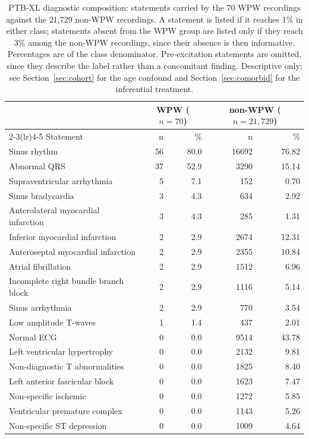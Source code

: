 \documentclass[11pt]{article}
\begin{document}
\begin{table}[htbp]
\centering
\footnotesize
\caption{PTB-XL diagnostic composition: statements carried by the 70 WPW recordings against the 21{,}729 non-WPW recordings. A statement is listed if it reaches 1\% in either class; statements absent from the WPW group are listed only if they reach 3\% among the non-WPW recordings, since their absence is then informative. Percentages are of the class denominator. Pre-excitation statements are omitted, since they describe the label rather than a concomitant finding. Descriptive only; see Section~\ref{sec:cohort} for the age confound and Section~\ref{sec:comorbid} for the inferential treatment.}
\label{tab:comorbid-ptbxl}
\begin{tabular}{lrrrr}
\toprule
 & \multicolumn{2}{c}{WPW ($n=70$)} & \multicolumn{2}{c}{non-WPW ($n=21{,}729$)} \\
\cmidrule(lr){2-3}\cmidrule(lr){4-5}
Statement & n & \% & n & \% \\
\midrule
Sinus rhythm & 56 & 80.0 & 16692 & 76.82 \\
Abnormal QRS & 37 & 52.9 & 3290 & 15.14 \\
Supraventricular arrhythmia & 5 & 7.1 & 152 & 0.70 \\
Sinus bradycardia & 3 & 4.3 & 634 & 2.92 \\
Anterolateral myocardial infarction & 3 & 4.3 & 285 & 1.31 \\
Inferior myocardial infarction & 2 & 2.9 & 2674 & 12.31 \\
Anteroseptal myocardial infarction & 2 & 2.9 & 2355 & 10.84 \\
Atrial fibrillation & 2 & 2.9 & 1512 & 6.96 \\
Incomplete right bundle branch block & 2 & 2.9 & 1116 & 5.14 \\
Sinus arrhythmia & 2 & 2.9 & 770 & 3.54 \\
Low amplitude T-waves & 1 & 1.4 & 437 & 2.01 \\
Normal ECG & 0 & 0.0 & 9514 & 43.78 \\
Left ventricular hypertrophy & 0 & 0.0 & 2132 & 9.81 \\
Non-diagnostic T abnormalities & 0 & 0.0 & 1825 & 8.40 \\
Left anterior fascicular block & 0 & 0.0 & 1623 & 7.47 \\
Non-specific ischemic & 0 & 0.0 & 1272 & 5.85 \\
Ventricular premature complex & 0 & 0.0 & 1143 & 5.26 \\
Non-specific ST depression & 0 & 0.0 & 1009 & 4.64 \\

\end{tabular}
\end{table}
\end{document}

